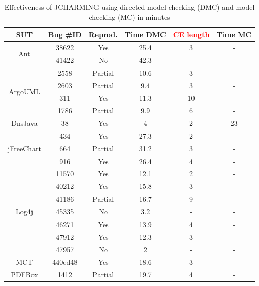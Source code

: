 \documentclass[times, doublespace]{smrauth}
\newcommand{\red}[1]{\textcolor{red}{#1}}
\begin{document}
{\begin{table}
\centering
\caption{Effectiveness of JCHARMING using directed model checking (DMC) and model checking (MC) in minutes}
\begin{tabular}{c|c|c|c|c|c}
SUT                         & Bug \#ID & Reprod. & Time DMC & \red{CE length} & Time MC \\ \hline \hline
\multirow{2}{*}{Ant}        & 38622    & Yes     & 25.4   & 3  & -       \\
                            & 41422    & No      & 42.3   & -  & -       \\ \hline
\multirow{4}{*}{ArgoUML}    & 2558     & Partial & 10.6   & 3  & -       \\
                            & 2603     & Partial & 9.4    & 3  & -       \\
                            & 311      & Yes     & 11.3   & 10  & -       \\
                            & 1786     & Partial & 9.9    & 6  & -       \\  \hline
DnsJava                     & 38       & Yes     & 4      & 2  & 23      \\ \hline
\multirow{3}{*}{jFreeChart} & 434      & Yes     & 27.3   & 2  & -       \\
                            & 664      & Partial & 31.2   & 3   & -       \\
                            & 916      & Yes     & 26.4   & 4  & -       \\ \hline
\multirow{7}{*}{Log4j}      & 11570    & Yes     & 12.1   & 2  & -       \\
                            & 40212    & Yes     & 15.8   & 3  & -       \\
                            & 41186    & Partial & 16.7   & 9  & -       \\
                            & 45335    & No      & 3.2    & -  & -       \\
                            & 46271    & Yes     & 13.9   & 4  & -       \\
                            & 47912    & Yes     & 12.3   & 3  & -       \\
                            & 47957    & No      & 2      & -  & -       \\ \hline
MCT                         & 440ed48  & Yes     & 18.6   & 3  & -       \\ \hline
\multirow{2}{*}{PDFBox}     & 1412     & Partial & 19.7   & 4  & -       \\

\end{tabular}
\end{table}}
\end{document}

